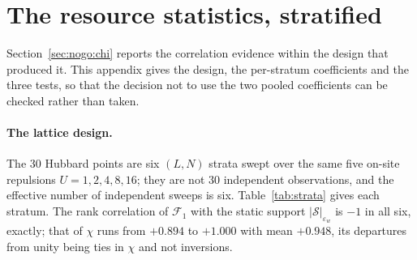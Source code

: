 
\section{The resource statistics, stratified}
\label{app:stats}

Section~\ref{sec:nogo:chi} reports the correlation evidence within the design that produced it. This
appendix gives the design, the per-stratum coefficients and the three tests, so that the decision not
to use the two pooled coefficients can be checked rather than taken.

\paragraph{The lattice design.} The $30$ Hubbard points are six $(L,N)$ strata swept over the same five
on-site repulsions $U=1,2,4,8,16$; they are not $30$ independent observations, and the effective number
of independent sweeps is six. Table~\ref{tab:strata} gives each stratum. The rank correlation of
$\mathcal F_1$ with the static support $|\mathcal S|_{\varepsilon_w}$ is $-1$ in all six, exactly; that
of $\chi$ runs from $+0.894$ to $+1.000$ with mean $+0.948$, its departures from unity being ties in
$\chi$ and not inversions.

